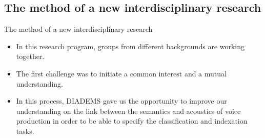 \documentclass[final, hyperref, table]{beamer}
\begin{document}
\subsection{The method of a new interdisciplinary research}
\begin{frame}{The method of a new interdisciplinary research}
  \begin{block}{}
    \begin{itemize}
    \item In this research program, groups from \alert{different backgrounds}
      are working together.
    \item The first challenge was to initiate a common interest and a
      \alert{mutual understanding}.
    \item In this process, DIADEMS gave us the opportunity to improve
      our understanding on the \alert{link between the semantics and
      acoustics of voice production} in order to be able to specify the classification and indexation tasks.
    \end{itemize}
\end{block}



\end{frame}
\end{document}
